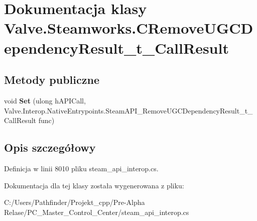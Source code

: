\hypertarget{class_valve_1_1_steamworks_1_1_c_remove_u_g_c_dependency_result__t___call_result}{}\section{Dokumentacja klasy Valve.\+Steamworks.\+C\+Remove\+U\+G\+C\+Dependency\+Result\+\_\+t\+\_\+\+Call\+Result}
\label{class_valve_1_1_steamworks_1_1_c_remove_u_g_c_dependency_result__t___call_result}
\subsection*{Metody publiczne}
\begin{DoxyCompactItemize}
\item 
\mbox{\label{class_valve_1_1_steamworks_1_1_c_remove_u_g_c_dependency_result__t___call_result_ae47e19dacda543f701f778e730d291e5}} 
void {\bfseries Set} (ulong h\+A\+P\+I\+Call, Valve.\+Interop.\+Native\+Entrypoints.\+Steam\+A\+P\+I\+\_\+\+Remove\+U\+G\+C\+Dependency\+Result\+\_\+t\+\_\+\+Call\+Result func)
\end{DoxyCompactItemize}


\subsection{Opis szczegółowy}


Definicja w linii 8010 pliku steam\+\_\+api\+\_\+interop.\+cs.



Dokumentacja dla tej klasy została wygenerowana z pliku\+:\begin{DoxyCompactItemize}
\item 
C\+:/\+Users/\+Pathfinder/\+Projekt\+\_\+cpp/\+Pre-\/\+Alpha Relase/\+P\+C\+\_\+\+Master\+\_\+\+Control\+\_\+\+Center/steam\+\_\+api\+\_\+interop.\+cs\end{DoxyCompactItemize}
